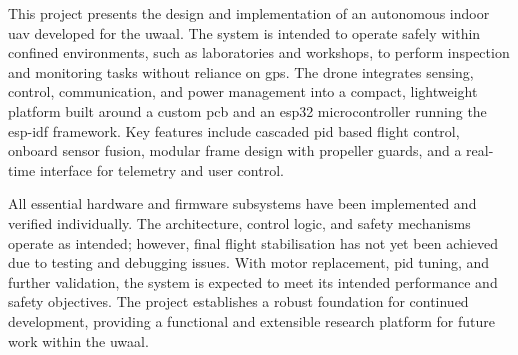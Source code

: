 This project presents the design and implementation of an autonomous indoor \gls{uav} developed for the \gls{uwaal}. The system is intended to operate safely within confined environments, such as laboratories and workshops, to perform inspection and monitoring tasks without reliance on \gls{gps}. The drone integrates sensing, control, communication, and power management into a compact, lightweight platform built around a custom \gls{pcb} and an \gls{esp32} microcontroller running the \gls{esp-idf} framework. Key features include cascaded \gls{pid} based flight control, onboard sensor fusion, modular frame design with propeller guards, and a real-time interface for telemetry and user control.

All essential hardware and firmware subsystems have been implemented and verified individually. The architecture, control logic, and safety mechanisms operate as intended; however, final flight stabilisation has not yet been achieved due to testing and debugging issues. With motor replacement, \gls{pid} tuning, and further validation, the system is expected to meet its intended performance and safety objectives. The project establishes a robust foundation for continued development, providing a functional and extensible research platform for future work within the \gls{uwaal}.